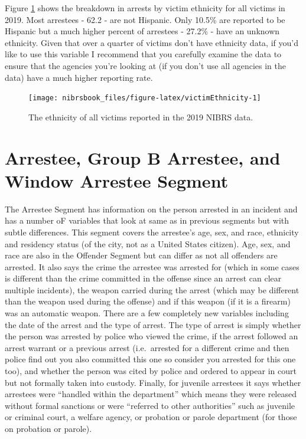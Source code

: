 \documentclass[
  12pt,
  openany]{book}
\begin{document}
Figure \ref{fig:victimEthnicity} shows the breakdown in arrests by victim ethnicity for all victims in 2019. Most arrestees - 62.2 - are not Hispanic. Only 10.5\% are reported to be Hispanic but a much higher percent of arrestees - 27.2\% - have an unknown ethnicity. Given that over a quarter of victims don't have ethnicity data, if you'd like to use this variable I recommend that you carefully examine the data to ensure that the agencies you're looking at (if you don't use all agencies in the data) have a much higher reporting rate.

\begin{figure}

{\centering \texttt{[image: nibrsbook\_files/figure-latex/victimEthnicity-1]} 

}

\caption{The ethnicity of all victims reported in the 2019 NIBRS data.}\label{fig:victimEthnicity}
\end{figure}

\hypertarget{arrestee}{%
\chapter{Arrestee, Group B Arrestee, and Window Arrestee Segment}\label{arrestee}}

The Arrestee Segment has information on the person arrested in an incident and has a number oF variables that look at same as in previous segments but with subtle differences. This segment covers the arrestee's age, sex, and race, ethnicity and residency status (of the city, not as a United States citizen). Age, sex, and race are also in the Offender Segment but can differ as not all offenders are arrested. It also says the crime the arrestee was arrested for (which in some cases is different than the crime committed in the offense since an arrest can clear multiple incidents), the weapon carried during the arrest (which may be different than the weapon used during the offense) and if this weapon (if it is a firearm) was an automatic weapon. There are a few completely new variables including the date of the arrest and the type of arrest. The type of arrest is simply whether the person was arrested by police who viewed the crime, if the arrest followed an arrest warrant or a previous arrest (i.e.~arrested for a different crime and then police find out you also committed this one so consider you arrested for this one too), and whether the person was cited by police and ordered to appear in court but not formally taken into custody. Finally, for juvenile arrestees it says whether arrestees were ``handled within the department'' which means they were released without formal sanctions or were ``referred to other authorities'' such as juvenile or criminal court, a welfare agency, or probation or parole department (for those on probation or parole).
\end{document}
